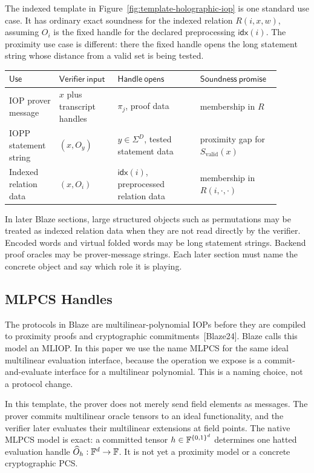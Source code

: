 The indexed template in Figure~\ref{fig:template-holographic-iop} is one
standard use case.  It has ordinary exact soundness for the indexed relation
\(R(i,x,w)\), assuming \(O_i\) is the fixed handle for the declared
preprocessing \(\mathsf{idx}(i)\).  The proximity use case is different: there
the fixed handle opens the long statement string whose distance from a valid set
is being tested.

\begin{center}
\small
\begin{tabular}{p{0.17\linewidth}|p{0.18\linewidth}|p{0.29\linewidth}|p{0.25\linewidth}}
\(\mathsf{Use}\) & \(\mathsf{Verifier\ input}\) & \(\mathsf{Handle\ opens}\) & \(\mathsf{Soundness\ promise}\) \\
\hline
IOP prover message & \(x\) plus transcript handles & \(\pi_j\), proof data & membership in \(R\) \\
IOPP statement string & \((x,O_y)\) & \(y\in\Sigma^D\), tested statement data & proximity gap for \(S_{\mathrm{valid}}(x)\) \\
Indexed relation data & \((x,O_i)\) & \(\mathsf{idx}(i)\), preprocessed relation data & membership in \(R(i,\cdot,\cdot)\)
\end{tabular}
\end{center}

In later Blaze sections, large structured objects such as permutations may be
treated as indexed relation data when they are not read directly by the
verifier.  Encoded words and virtual folded words may be long statement
strings.  Backend proof oracles may be prover-message strings.  Each later
section must name the concrete object and say which role it is playing.

\subsection{MLPCS Handles}

The protocols in Blaze are multilinear-polynomial IOPs before they are compiled
to proximity proofs and cryptographic commitments~[Blaze24].  Blaze calls this
model an MLIOP.  In this paper we use the name MLPCS for the same ideal
multilinear evaluation interface, because the operation we expose is a
commit-and-evaluate interface for a multilinear polynomial.  This is a naming
choice, not a protocol change.

In this template, the prover does not merely send field elements as messages.
The prover commits multilinear oracle tensors to an ideal functionality, and
the verifier later evaluates their multilinear extensions at field points.  The
native MLPCS model is exact: a committed tensor \(h\in\mathbb{F}^{\{0,1\}^d}\) determines one
hatted evaluation handle \(\widehat O_h:\mathbb{F}^d\to\mathbb{F}\).  It is not yet a
proximity model or a concrete cryptographic PCS.

